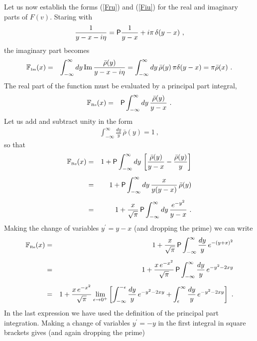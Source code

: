 \documentclass[preprint,12pt,eqsecnum,nofootinbib,amsmath,amssymb]{revtex4}
\newcommand{\smRe}{{\rm\scriptscriptstyle Re}}
\newcommand{\smIm}{{\rm\scriptscriptstyle Im}}
\begin{document}
{{Let us now establish the forms (\ref{Fru}) and (\ref{Fiu}) for the real
and imaginary parts of $F(v)$.  
Staring with
\begin{eqnarray}
  \frac{1}{y - x - i \eta} 
  =
  {\sf P}\frac{1}{y-x} + i \pi\,\delta(y-x) \ ,
\end{eqnarray}
the imaginary part becomes 
\begin{eqnarray}
  \mathbb{F}_\smIm(x) 
  &=& 
  \int_{-\infty}^\infty dy\, 
  {\rm Im}\,\frac{\bar\rho(y)}{y - x - i \eta} 
  =
  \int_{-\infty}^\infty dy\, \bar\rho(y) \,
  \pi \delta(y-x)
  =
  \pi \bar\rho(x) \ .
\end{eqnarray}
The real part of the function must be evaluated by a principal part
integral,
\begin{eqnarray}
  \mathbb{F}_\smRe(x) 
  &=& 
  {\sf P}\int_{-\infty}^\infty dy\, \frac{\bar\rho(y)}{y - x}  \ .
\end{eqnarray}
Let us add and subtract unity in the form
\begin{eqnarray}
  \int_{-\infty}^\infty \frac{dy}{y}\, \bar\rho(y) = 1 \ ,
\end{eqnarray}
so that
\begin{eqnarray}
  \mathbb{F}_\smRe(x) 
  &=& 
  1 +
  {\sf P}\int_{-\infty}^\infty dy\, 
  \left[\frac{\bar\rho(y)}{y - x} - \frac{\bar\rho(y)}{y}\right] 
\\[5pt]
  &=& 
  1 +
  {\sf P}\int_{-\infty}^\infty dy\, \frac{x}{y(y - x)}\, \bar\rho(y)
\\[5pt]
  &=& 
  1 +
  \frac{x}{\sqrt{\pi}}\,
  {\sf P}\int_{-\infty}^\infty dy\, \frac{e^{-y^2}}{y - x} \ .
\end{eqnarray}
Making the change of variables $y^\prime=y-x$ (and dropping the prime)
we can write 
\begin{eqnarray}
  \mathbb{F}_\smRe(x) 
  &=& 
  1 +
  \frac{x}{\sqrt{\pi}}\,
  {\sf P}\int_{-\infty}^\infty \frac{dy}{y}\, e^{-(y+x)^2} 
\\[5pt]
  &=&
  1 +
  \frac{x\,e^{-x^2}}{\sqrt{\pi}}\,
  {\sf P}\int_{-\infty}^\infty \frac{dy}{y}\, e^{-y^2 - 2 x y} 
\\[5pt]
  &=&
  1 +
  \frac{x\,e^{-x^2}}{\sqrt{\pi}}\lim_{\epsilon\to0^+}\left[
  \int_{-\infty}^{-\epsilon} \frac{dy}{y}\, e^{-y^2 - 2 x y} 
  +
  \int_\epsilon^\infty \frac{dy}{y}\, e^{-y^2 - 2 x y} 
  \right] \ .
\end{eqnarray}
In the last expression we have used the definition of the principal
part integration.  Making a change of variables $y^\prime=-y$ in the
first integral in square brackets gives (and again dropping the prime)
}}
\end{document}
